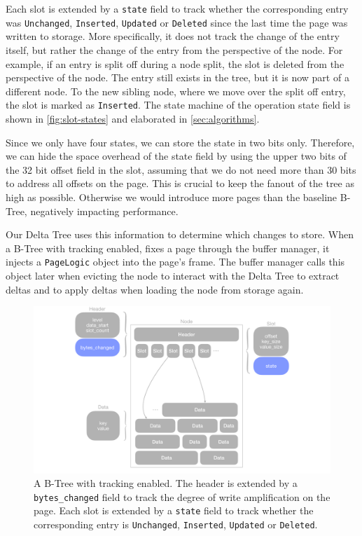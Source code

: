 Each slot is extended by a \texttt{state} field to track whether the corresponding entry was \texttt{Unchanged}, \texttt{Inserted}, \texttt{Updated} or \texttt{Deleted} since the last time the page was written to storage.
More specifically, it does not track the change of the entry itself, but rather the change of the entry from the perspective of the node.
For example, if an entry is split off during a node split, the slot is deleted from the perspective of the node.
The entry still exists in the tree, but it is now part of a different node.
To the new sibling node, where we move over the split off entry, the slot is marked as \texttt{Inserted}.
The state machine of the operation state field is shown in \autoref{fig:slot-states} and elaborated in \autoref{sec:algorithms}.

Since we only have four states, we can store the state in two bits only.
Therefore, we can hide the space overhead of the state field by using the upper two bits of the 32 bit offset field in the slot, assuming that we do not need more than 30 bits to address all offsets on the page.
This is crucial to keep the fanout of the tree as high as possible. Otherwise we would introduce more pages than the baseline B-Tree, negatively impacting performance.

Our Delta Tree uses this information to determine which changes to store.
When a B-Tree with tracking enabled, fixes a page through the buffer manager, it injects a \texttt{PageLogic} object into the page's frame.
The buffer manager calls this object later when evicting the node to interact with the Delta Tree to extract deltas and to apply deltas when loading the node from storage again.

\begin{figure}[htbp]
  \centering
  \includegraphics[width=1\textwidth]{figures/b_tree_with_tracking.pdf}
  \caption{A B-Tree with tracking enabled. The header is extended by a \texttt{bytes\_changed} field to track the degree of write amplification on the page. Each slot is extended by a \texttt{state} field to track whether the corresponding entry is \texttt{Unchanged}, \texttt{Inserted}, \texttt{Updated} or \texttt{Deleted}.}
  \label{fig:b-tree-with-tracking}
\end{figure}

